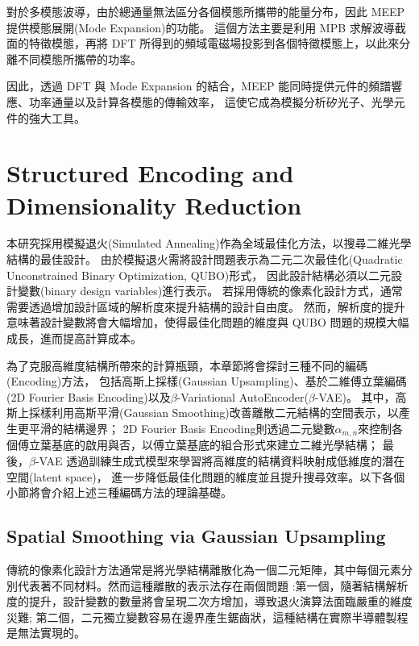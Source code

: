 對於多模態波導，由於總通量無法區分各個模態所攜帶的能量分布，因此 MEEP 提供模態展開(Mode Expansion)的功能。
這個方法主要是利用 MPB 求解波導截面的特徵模態，再將 DFT 所得到的頻域電磁場投影到各個特徵模態上，以此來分離不同模態所攜帶的功率。

因此，透過 DFT 與 Mode Expansion 的結合，MEEP 能同時提供元件的頻譜響應、功率通量以及計算各模態的傳輸效率，
這使它成為模擬分析矽光子、光學元件的強大工具。
\clearpage
\section{Structured Encoding and Dimensionality Reduction}
\label{ch:Encoding_Strategies_Theory}
本研究採用模擬退火(Simulated Annealing)作為全域最佳化方法，以搜尋二維光學結構的最佳設計。
由於模擬退火需將設計問題表示為二元二次最佳化(Quadratic Unconstrained Binary Optimization, QUBO)形式，
因此設計結構必須以二元設計變數(binary design variables)進行表示。
若採用傳統的像素化設計方式，通常需要透過增加設計區域的解析度來提升結構的設計自由度。
然而，解析度的提升意味著設計變數將會大幅增加，使得最佳化問題的維度與 QUBO 問題的規模大幅成長，進而提高計算成本。

為了克服高維度結構所帶來的計算瓶頸，本章節將會探討三種不同的編碼(Encoding)方法，
包括高斯上採樣(Gaussian Upsampling)、基於二維傅立葉編碼(2D Fourier Basis Encoding)以及$\beta$-Variational AutoEncoder($\beta$-VAE)。
其中，高斯上採樣利用高斯平滑(Gaussian Smoothing)改善離散二元結構的空間表示，以產生更平滑的結構邊界；
2D Fourier Basis Encoding則透過二元變數$\alpha_{m,n}$來控制各個傅立葉基底的啟用與否，以傅立葉基底的組合形式來建立二維光學結構；
最後，$\beta$-VAE 透過訓練生成式模型來學習將高維度的結構資料映射成低維度的潛在空間(latent space)，
進一步降低最佳化問題的維度並且提升搜尋效率。以下各個小節將會介紹上述三種編碼方法的理論基礎。

\subsection{Spatial Smoothing via Gaussian Upsampling}
\label{ch:GU_theory}
傳統的像素化設計方法通常是將光學結構離散化為一個二元矩陣，其中每個元素分別代表著不同材料。然而這種離散的表示法存在兩個問題
:第一個，隨著結構解析度的提升，設計變數的數量將會呈現二次方增加，導致退火演算法面臨嚴重的維度災難; 
第二個，二元獨立變數容易在邊界產生鋸齒狀，這種結構在實際半導體製程是無法實現的。

